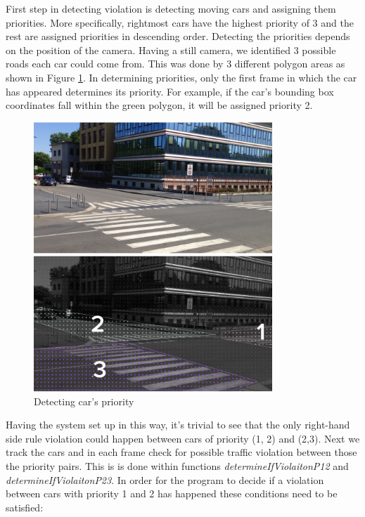 \documentclass[12pt]{article} %
\begin{document}
First step in detecting violation is detecting moving cars and assigning them priorities. More specifically, rightmost cars have the highest priority of 3 and the rest are assigned priorities in descending order. 
Detecting the priorities depends on the position of the camera. Having a still camera, we identified 3 possible roads each car could come from. This was done by 3 different polygon areas as shown in Figure \ref{fig:priorities}. In determining priorities, only the first frame in which the car has appeared determines its priority. For example, if the car's bounding box coordinates fall within the green polygon, it will be assigned priority 2. 

\begin{figure}[ht]
\centering
\includegraphics[width=0.8\textwidth]{images/priority_detection.jpg}
\caption{Detecting car's priority}
\label{fig:priorities}
\end{figure}

Having the system set up in this way, it's trivial to see that the only right-hand side rule violation could happen between cars of priority (1, 2) and  (2,3). 
Next we track the cars and in each frame check for possible traffic violation between those the priority pairs. This is is done within functions \textit{determineIfViolaitonP12} and \textit{determineIfViolaitonP23}. In order for the program to decide if a violation between cars with priority 1 and 2 has happened these conditions need to be satisfied:
\end{document}
